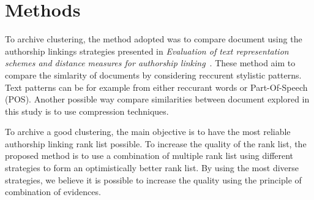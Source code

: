 \section{Methods \label{sec:methods}}

To archive clustering, the method adopted was to compare document using the authorship linkings strategies presented in \textit{Evaluation of text representation schemes and distance measures for authorship linking}~\cite{kocher_verification}.
These method aim to compare the simlarity of documents by considering reccurent stylistic patterns.
Text patterns can be for example from either reccurant words or Part-Of-Speech (POS).
Another possible way compare similarities between document explored in this study is to use compression techniques.

To archive a good clustering, the main objective is to have the most reliable authorship linking rank list possible.
To increase the quality of the rank list, the proposed method is to use a combination of multiple rank list using different strategies to form an optimistically better rank list.
By using the most diverse strategies, we believe it is possible to increase the quality using the principle of combination of evidences.







